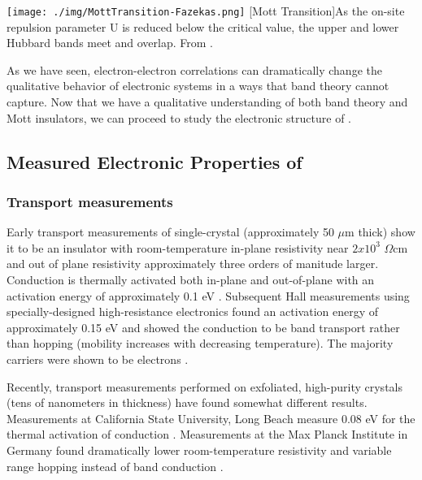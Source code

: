 \begin{centering}
\texttt{[image: ./img/MottTransition-Fazekas.png]}
  \captionsetup{width=0.75\textwidth}
  [Mott Transition]{As the on-site repulsion parameter U is reduced below the critical value, the upper and lower Hubbard bands meet and overlap. From \cite{Fazekas1990}.} 
  \label{fig:RuCl3ElecStruct-4}
\end{centering}

As we have seen, electron-electron correlations can dramatically change the qualitative behavior of electronic systems in a ways that band theory cannot capture. Now that we have a qualitative understanding of both band theory and Mott insulators, we can proceed to study the electronic structure of \ruclnospace .

\subsection{Measured Electronic Properties of \texorpdfstring{\rucl}{RuCl3}}

\subsubsection{Transport measurements}

Early transport measurements of single-crystal \rucl (approximately 50 $\mu$m thick) show it to be an insulator with room-temperature in-plane resistivity near $2x10^{3}$ $\Omega$cm and out of plane resistivity approximately three orders of manitude larger. Conduction is thermally activated both in-plane and out-of-plane with an activation energy of approximately 0.1 eV \cite{Binotto1971}. Subsequent Hall measurements using specially-designed high-resistance electronics found an activation energy of approximately 0.15 eV and showed the conduction to be band transport rather than hopping (mobility increases with decreasing temperature). The majority carriers were shown to be electrons \cite{Rojas1983}.

Recently, transport measurements performed on exfoliated, high-purity \rucl crystals (tens of nanometers in thickness) have found somewhat different results. Measurements at California State University, Long Beach measure 0.08 eV for the thermal activation of conduction \cite{Kim2017}. Measurements at the Max Planck Institute in Germany found dramatically lower room-temperature resistivity and variable range hopping instead of band conduction \cite{Mashhadi2018}. 

